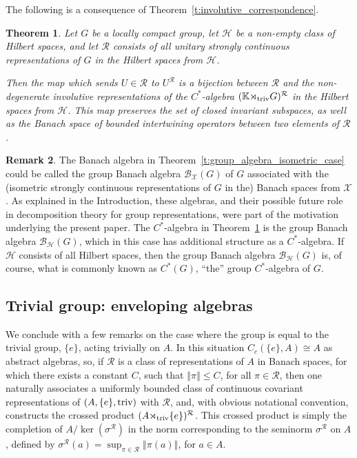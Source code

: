 \documentclass{amsart}
\theoremstyle{plain}
\newtheorem{theorem}{Theorem}[section]
\theoremstyle{definition}
\newtheorem{remark}[theorem]{Remark}
\numberwithin{equation}{section}
\begin{document}
The following is a consequence of Theorem~\ref{t:involutive_correspondence}.

\begin{theorem}\label{t:group_algebra_involutive_case}
Let $G$ be a locally compact group, let $\mathcal H$ be a non-empty class of Hilbert spaces, and let $\mathcal R$ consists of all unitary strongly continuous representations of $G$ in the Hilbert spaces from $\mathcal H$.

Then the map which sends $U\in\mathcal R$ to $U^{\mathcal R}$ is a bijection between $\mathcal R$ and the non-degenerate involutive representations of the $C^*$-algebra $(\mathbb K{\rtimes}_{\textup{triv}} G)^{\mathcal R}$  in the Hilbert spaces from $\mathcal H$. This map preserves the set of closed invariant subspaces, as well as the Banach space of bounded intertwining operators between two elements of ${\mathcal R}$.
\end{theorem}

\begin{remark}
The Banach algebra in Theorem~\ref{t:group_algebra_isometric_case} could be called the group Banach algebra $\mathcal B_{\mathcal X}(G)$ of $G$ associated with the (isometric strongly continuous representations of $G$ in the) Banach spaces from $\mathcal X$. As explained in the Introduction, these algebras, and their possible future role in decomposition theory for group representations, were part of the motivation underlying the present paper. The $C^*$-algebra in Theorem~\ref{t:group_algebra_involutive_case} is the group Banach algebra $\mathcal B_{\mathcal H}(G)$, which in this case has additional structure as a $C^*$-algebra. If $\mathcal H$ consists of all Hilbert spaces, then the group Banach algebra $\mathcal B_{\mathcal H}(G)$ is, of course, what is commonly known as $C^*(G)$, ``the'' group $C^*$-algebra of $G$.
\end{remark}

\subsection{Trivial group: enveloping algebras}\label{subsec:trivial_group}

We conclude with a few remarks on the case where the group is equal to the trivial group, $\{ e \}$, acting trivially on $A$. In this situation $C_c(\{e\}, A) \cong A$ as abstract algebras, so, if ${\mathcal R}$ is a class of representations of $A$ in Banach spaces, for which there exists a constant $C$, such that ${\left\Vert {\pi} \right\Vert}\leq C$, for all $\pi\in{\mathcal R}$, then one naturally associates a uniformly bounded class of continuous covariant representations of $(A,\{e\},{\textup{triv}})$ with ${\mathcal R}$, and, with obvious notational convention, constructs the crossed product $(A {\rtimes}_{\textup{triv}} \{e\})^{\mathcal R}$. This crossed product is simply the completion of $A / \ker({\sigma^{\mathcal R}})$ in the norm corresponding to the seminorm ${\sigma^{\mathcal R}}$ on $A$, defined by ${\sigma^{\mathcal R}}(a)=\sup_{\pi \in {\mathcal R}}{\left\Vert {\pi(a)} \right\Vert}$, for $a\in A$.
\end{document}
